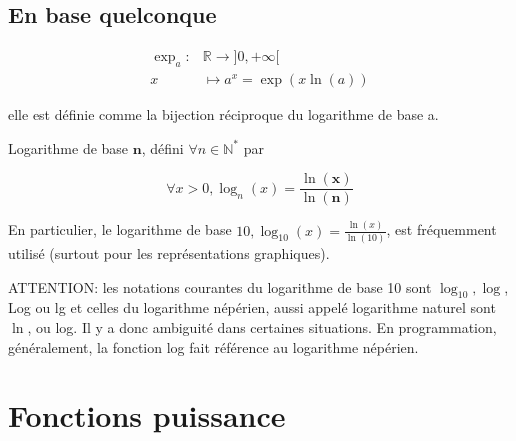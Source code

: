 
\subsection*{En base quelconque}
$$
\begin{aligned}
\exp _a: & \mathbb{R} \rightarrow] 0,+\infty[ \\
x & \mapsto a^x=\exp (x \ln (a))
\end{aligned}
$$

elle est définie comme la bijection réciproque du logarithme de base a.

Logarithme de base $\mathbf{n}$, défini $\forall n \in \mathbb{N}^*$ par

$$
\forall x>0, \log _n(x)=\frac{\ln (\mathbf{x})}{\ln (\mathbf{n})}
$$


En particulier, le logarithme de base $10, \log _{10}(x)=\frac{\ln (x)}{\ln (10)}$, est fréquemment utilisé (surtout pour les représentations graphiques).

ATTENTION: les notations courantes du logarithme de base 10 sont $\log _{10}, \log$, Log ou lg et celles du logarithme népérien, aussi appelé logarithme naturel sont $\ln$, ou log. Il y a donc ambiguité dans certaines situations. En programmation, généralement, la fonction log fait référence au logarithme népérien. 

\begin{figure}[H]
    \centering
\end{figure}

\section{Fonctions puissance}

